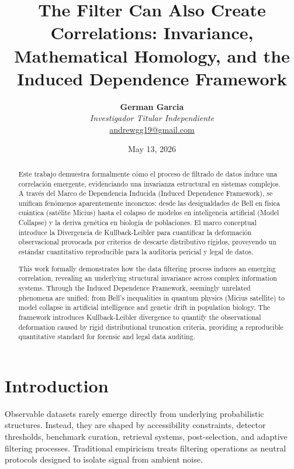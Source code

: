 \documentclass[11pt,twocolumn]{article}
\title{\textbf{The Filter Can Also Create Correlations: Invariance, Mathematical Homology, and the Induced Dependence Framework}}
\author{\textbf{German Garcia} \\ \textit{Investigador Titular Independiente} \\ \small{\href{mailto:andrewgg19@gmail.com}{andrewgg19@gmail.com}}}
\date{May 13, 2026}
\begin{document}
\maketitle

\begin{abstract}
Este trabajo demuestra formalmente cómo el proceso de filtrado de datos induce una correlación emergente, evidenciando una invarianza estructural en sistemas complejos. A través del Marco de Dependencia Inducida (Induced Dependence Framework), se unifican fenómenos aparentemente inconexos: desde las desigualdades de Bell en física cuántica (satélite Micius) hasta el colapso de modelos en inteligencia artificial (Model Collapse) y la deriva genética en biología de poblaciones. El marco conceptual introduce la Divergencia de Kullback-Leibler para cuantificar la deformación observacional provocada por criterios de descarte distributivo rígidos, proveyendo un estándar cuantitativo reproducible para la auditoría pericial y legal de datos.
\end{abstract}

\begin{abstract}
This work formally demonstrates how the data filtering process induces an emerging correlation, revealing an underlying structural invariance across complex information systems. Through the Induced Dependence Framework, seemingly unrelated phenomena are unified: from Bell's inequalities in quantum physics (Micius satellite) to model collapse in artificial intelligence and genetic drift in population biology. The framework introduces Kullback-Leibler divergence to quantify the observational deformation caused by rigid distributional truncation criteria, providing a reproducible quantitative standard for forensic and legal data auditing.
\end{abstract}


\section{Introduction}
Observable datasets rarely emerge directly from underlying probabilistic structures. Instead, they are shaped by accessibility constraints, detector thresholds, benchmark curation, retrieval systems, post-selection, and adaptive filtering processes. Traditional empiricism treats filtering operations as neutral protocols designed to isolate signal from ambient noise.
\end{document}
